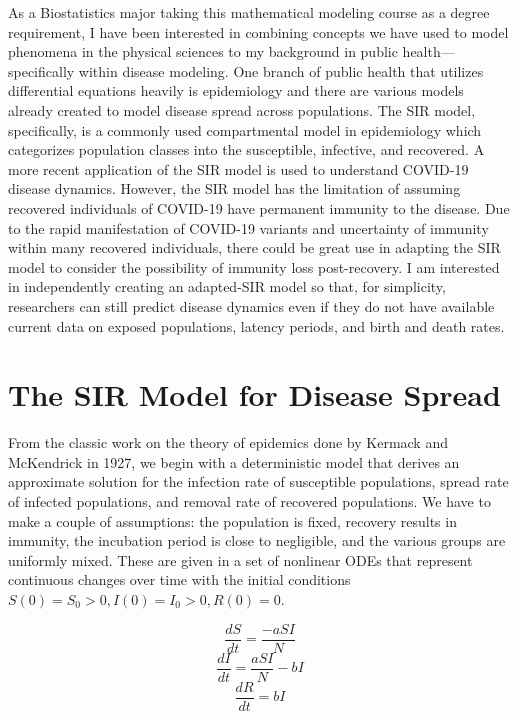 \documentclass[%
 reprint,
]{revtex4-2}
\begin{document}
As a Biostatistics major taking this mathematical modeling course as a degree requirement, I have been interested in combining concepts we have used to model phenomena in the physical sciences to my background in public health—specifically within disease modeling. One branch of public health that utilizes differential equations heavily is epidemiology and there are various models already created to model disease spread across populations. The SIR model, specifically, is a commonly used compartmental model in epidemiology which categorizes population classes into the susceptible, infective, and recovered. A more recent application of the SIR model is used to understand COVID-19 disease dynamics. However, the SIR model has the limitation of assuming recovered individuals of COVID-19 have permanent immunity to the disease. Due to the rapid manifestation of COVID-19 variants and uncertainty of immunity within many recovered individuals, there could be great use in adapting the SIR model to consider the possibility of immunity loss post-recovery. I am interested in independently creating an adapted-SIR model so that, for simplicity, researchers can still predict disease dynamics even if they do not have available current data on exposed populations, latency periods, and birth and death rates.

\section{\label{sec:level1}The SIR Model for Disease Spread\protect\\}

From the classic work on the theory of epidemics done by Kermack and McKendrick in 1927, we begin with a deterministic model that derives an approximate solution for the infection rate of susceptible populations, spread rate of infected populations, and removal rate of recovered populations. We have to make a couple of assumptions: the population is fixed, recovery results in immunity, the incubation period is close to negligible, and the various groups are uniformly mixed. These are given in a set of nonlinear ODEs that represent continuous changes over time with the initial conditions $S(0)=S_0>0, I(0)=I_0>0, R(0)=0$.

\begin{equation} \frac{dS}{dt} = \frac{-aSI}{N} \end{equation}
\begin{equation} \frac{dI}{dt} = \frac{aSI}{N} - bI \end{equation}
\begin{equation} \frac{dR}{dt} = bI \end{equation}
\end{document}
